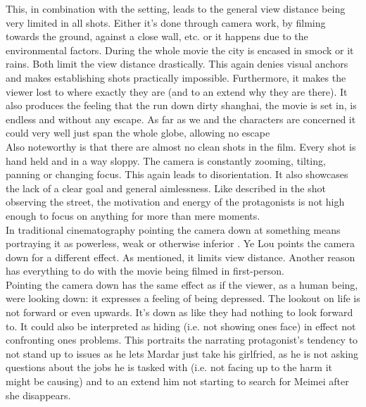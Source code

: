\documentclass[fleqn,14pt]{article}
\begin{document}
This, in combination with the setting, leads to the general view distance being very limited in all shots.
Either it's done through camera work, by filming towards the ground, against a close wall, etc. or it happens
due to the environmental factors. During the whole movie the city is encased in smock or it rains.
Both limit the view distance drastically. This again denies visual anchors and makes establishing shots practically impossible.
Furthermore, it makes the viewer lost to where exactly they are (and to an extend why they are there). It also
produces the feeling that the run down dirty shanghai, the movie is set in, is endless and without any escape. As
far as we and the characters are concerned it could very well just span the whole globe, allowing no escape\\

Also noteworthy is that there are almost no clean shots in the film.
Every shot is hand held and in a way sloppy. The camera is constantly zooming, tilting, panning or changing
focus. This again leads to disorientation. It also showcases the lack of a clear goal and general aimlessness.
Like described in the shot observing the street, the motivation and energy of the protagonists is not high enough 
to focus on anything for more than mere moments.\\

In traditional cinematography pointing the camera down at something means portraying it as powerless, weak or
otherwise inferior \cite[p. 192]{Bordwell}. Ye Lou points the camera down for a different effect. As mentioned, it 
limits view distance. Another reason has everything to do with the movie being filmed in first-person.\\
Pointing the camera down has the same effect as if the viewer, as a human being, were looking down: it expresses 
a feeling of being depressed.
The lookout on life is not forward or even upwards. It's down as like they had nothing to look forward to.
It could also be interpreted as hiding (i.e. not showing ones face) in effect not confronting ones problems.
This portraits the narrating protagonist's tendency to not stand up to issues
as he lets Mardar just take his girlfried, as he is not asking questions about the jobs he is tasked with (i.e. not facing
up to the harm it might be causing) and to an extend him not starting to search for Meimei after she disappears.\\
\end{document}
